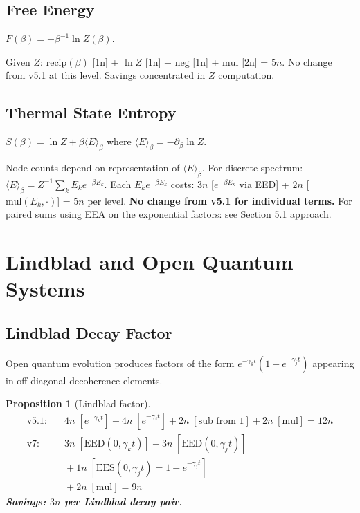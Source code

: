 \documentclass[11pt]{article}
\newtheorem{proposition}[theorem]{Proposition}
\begin{document}
\subsection{Free Energy}

$F(\beta)=-\beta^{-1}\ln Z(\beta)$.

Given $Z$: $\mathrm{recip}(\beta)$ [1n] + $\ln Z$ [1n] + $\mathrm{neg}$ [1n] + $\mathrm{mul}$ [2n] = $5n$.
No change from v5.1 at this level. Savings concentrated in $Z$ computation.

\subsection{Thermal State Entropy}

$S(\beta)=\ln Z+\beta\langle E\rangle_\beta$ where $\langle E\rangle_\beta=-\partial_\beta\ln Z$.

Node counts depend on representation of $\langle E\rangle_\beta$. For discrete spectrum:
$\langle E\rangle_\beta = Z^{-1}\sum_k E_k e^{-\beta E_k}$.
Each $E_k e^{-\beta E_k}$ costs: $3n$ [$e^{-\beta E_k}$ via EED] + $2n$ [$\mathrm{mul}(E_k,\cdot)$] = $5n$ per level.
\textbf{No change from v5.1 for individual terms.}
For paired sums using EEA on the exponential factors: see Section 5.1 approach.

\section{Lindblad and Open Quantum Systems}

\subsection{Lindblad Decay Factor}

Open quantum evolution produces factors of the form $e^{-\gamma_k t}(1-e^{-\gamma_j t})$
appearing in off-diagonal decoherence elements.

\begin{proposition}[Lindblad factor]
\begin{align*}
\text{v5.1:} &\quad 4n\;[e^{-\gamma_k t}] + 4n\;[e^{-\gamma_j t}] + 2n\;[\text{sub from 1}] + 2n\;[\text{mul}] = 12n \\
\text{v7:}   &\quad 3n\;[\mathrm{EED}(0,\gamma_k t)] + 3n\;[\mathrm{EED}(0,\gamma_j t)]\\
             &\quad+ 1n\;[\mathrm{EES}(0,\gamma_j t)=1-e^{-\gamma_j t}]\\
             &\quad+ 2n\;[\mathrm{mul}] = 9n
\end{align*}
\textbf{Savings: $3n$ per Lindblad decay pair.}
\end{proposition}
\end{document}
